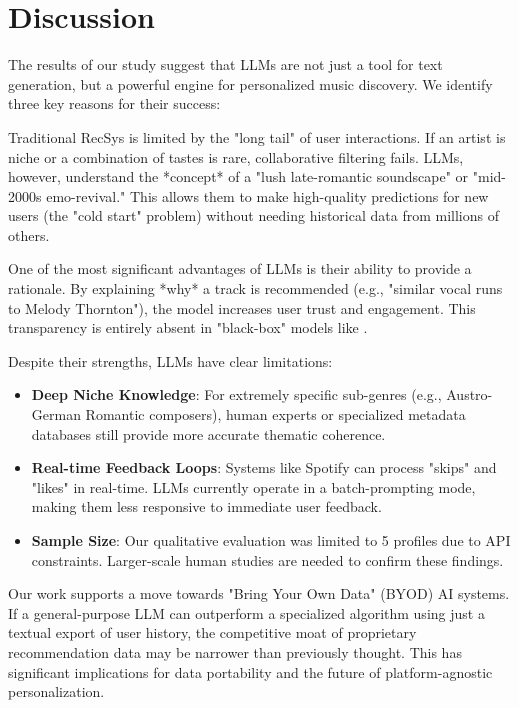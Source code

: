 \section{Discussion}

The results of our study suggest that LLMs are not just a tool for text generation, but a powerful engine for personalized music discovery. We identify three key reasons for their success:

Traditional RecSys is limited by the "long tail" of user interactions. If an artist is niche or a combination of tastes is rare, collaborative filtering fails. LLMs, however, understand the *concept* of a "lush late-romantic soundscape" or "mid-2000s emo-revival." This allows them to make high-quality predictions for new users (the "cold start" problem) without needing historical data from millions of others.

One of the most significant advantages of LLMs is their ability to provide a rationale. By explaining *why* a track is recommended (e.g., "similar vocal runs to Melody Thornton"), the model increases user trust and engagement. This transparency is entirely absent in "black-box" models like \lightgcn.

Despite their strengths, LLMs have clear limitations:
\begin{itemize}[leftmargin=*,itemsep=0pt,topsep=0pt]
    \item {\bf Deep Niche Knowledge}: For extremely specific sub-genres (e.g., Austro-German Romantic composers), human experts or specialized metadata databases still provide more accurate thematic coherence.
    \item {\bf Real-time Feedback Loops}: Systems like Spotify can process "skips" and "likes" in real-time. LLMs currently operate in a batch-prompting mode, making them less responsive to immediate user feedback.
    \item {\bf Sample Size}: Our qualitative evaluation was limited to 5 profiles due to API constraints. Larger-scale human studies are needed to confirm these findings.
\end{itemize}

Our work supports a move towards "Bring Your Own Data" (BYOD) AI systems. If a general-purpose LLM can outperform a specialized algorithm using just a textual export of user history, the competitive moat of proprietary recommendation data may be narrower than previously thought. This has significant implications for data portability and the future of platform-agnostic personalization.
